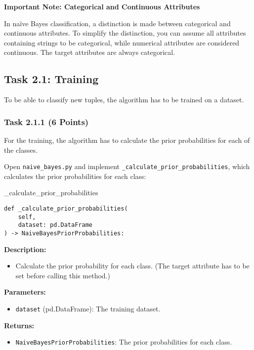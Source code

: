 \documentclass[
english,
smallborders
]{i6prcsht}
\newcommand{\points}[1]{\hfill \color{red}(#1 Points)\color{black}}
\begin{document}
\vspace*{1mm}

\begin{mdframed}
	\begin{em}
		\textbf{Important Note: Categorical and Continuous Attributes}
		
		In naïve Bayes classification, a distinction is made between categorical and continuous attributes. To simplify the distinction, you can assume all attributes containing strings to be categorical, while numerical attributes are considered continuous. The target attributes are always categorical.
	\end{em}
\end{mdframed}

\subsection*{Task 2.1: Training}

To be able to classify new tuples, the algorithm has to be trained on a dataset.

\subsubsection*{Task 2.1.1 \points{6}}

For the training, the algorithm has to calculate the prior probabilities for each of the classes.

Open \texttt{naive\_bayes.py} and implement \texttt{\_calculate\_prior\_probabilities}, which calculates the prior probabilities for each class:

\vspace*{0.3cm}

\begin{functionbox}{\_calculate\_prior\_probabilities}
	\begin{lstlisting}[numbers=none]
def _calculate_prior_probabilities(
    self, 
    dataset: pd.DataFrame
) -> NaiveBayesPriorProbabilities:
\end{lstlisting}
	
	\textbf{Description:}
	\begin{itemize}[leftmargin=*,topsep=0pt]
		\item Calculate the prior probability for each class. (The target attribute has to be set before calling this method.)
	\end{itemize}
	
	\textbf{Parameters:}
	\begin{itemize}[leftmargin=*,topsep=0pt]
		\item \texttt{dataset} (pd.DataFrame): The training dataset.
	\end{itemize}
	
	\textbf{Returns:}
	\begin{itemize}[leftmargin=*,topsep=0pt]
		\item \texttt{NaiveBayesPriorProbabilities}: The prior probabilities for each class.
	\end{itemize}
\end{functionbox}
\end{document}

